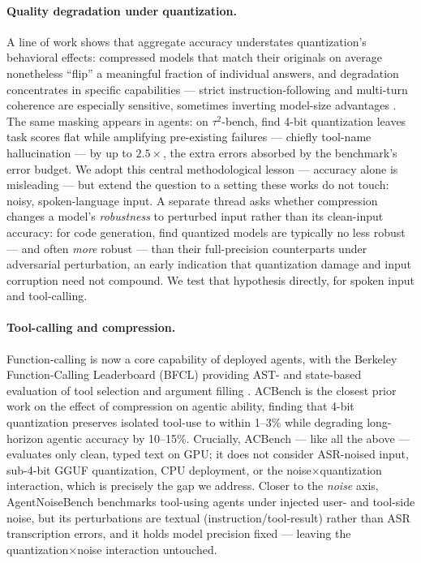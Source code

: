 \documentclass[11pt]{article}
\begin{document}
\paragraph{Quality degradation under quantization.} A line of work shows that
aggregate accuracy understates quantization's behavioral effects: compressed models
that match their originals on average nonetheless ``flip'' a meaningful fraction of
individual answers, and degradation concentrates in specific capabilities --- strict
instruction-following and multi-turn coherence are especially sensitive, sometimes
inverting model-size advantages \citep{lee2024,dutta2024,li2024}. The same masking
appears in agents: on $\tau^2$-bench, \citet{jang2026} find 4-bit quantization leaves
task scores flat while amplifying pre-existing failures --- chiefly tool-name
hallucination --- by up to $2.5\times$, the extra errors absorbed by the benchmark's
error budget. We adopt this central methodological lesson --- accuracy alone is
misleading --- but extend the question to a setting these works do not touch: noisy,
spoken-language input. A
separate thread asks whether compression changes a model's \emph{robustness} to
perturbed input rather than its clean-input accuracy: for code generation,
\citet{fang2025} find quantized models are typically no less robust --- and often
\emph{more} robust --- than their full-precision counterparts under adversarial
perturbation, an early indication that quantization damage and input corruption need
not compound. We test that hypothesis directly, for spoken input and tool-calling.

\paragraph{Tool-calling and compression.} Function-calling is now a core capability of
deployed agents, with the Berkeley Function-Calling Leaderboard (BFCL) providing AST-
and state-based evaluation of tool selection and argument filling \citep{patil2024}.
ACBench \citep{dong2025} is the closest prior work on the effect of compression on
agentic ability, finding that 4-bit quantization preserves isolated tool-use to within
1--3\% while degrading long-horizon agentic accuracy by 10--15\%. Crucially, ACBench
--- like all the above --- evaluates only clean, typed text on GPU; it does not
consider ASR-noised input, sub-4-bit GGUF quantization, CPU deployment, or the
noise$\times$quantization interaction, which is precisely the gap we address. Closer
to the \emph{noise} axis, AgentNoiseBench \citep{wang2026} benchmarks tool-using
agents under injected user- and tool-side noise, but its perturbations are textual
(instruction/tool-result) rather than ASR transcription errors, and it holds model
precision fixed --- leaving the quantization$\times$noise interaction untouched.
\end{document}
